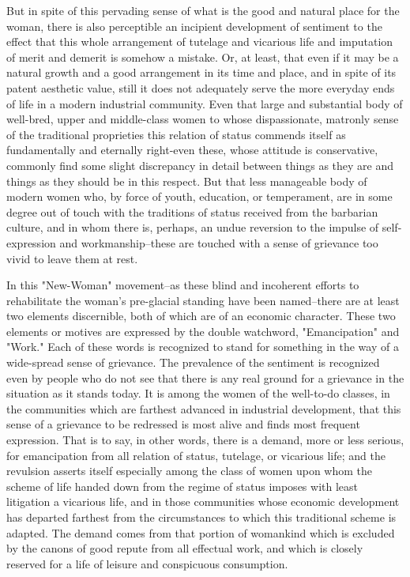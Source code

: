\documentclass[12pt]{report}
\begin{document}
But in spite of this pervading sense of what is the good and natural
place for the woman, there is also perceptible an incipient development
of sentiment to the effect that this whole arrangement of tutelage and
vicarious life and imputation of merit and demerit is somehow a mistake.
Or, at least, that even if it may be a natural growth and a good
arrangement in its time and place, and in spite of its patent aesthetic
value, still it does not adequately serve the more everyday ends of life
in a modern industrial community. Even that large and substantial body
of well-bred, upper and middle-class women to whose dispassionate,
matronly sense of the traditional proprieties this relation of status
commends itself as fundamentally and eternally right-even these, whose
attitude is conservative, commonly find some slight discrepancy in
detail between things as they are and things as they should be in this
respect. But that less manageable body of modern women who, by force of
youth, education, or temperament, are in some degree out of touch with
the traditions of status received from the barbarian culture, and
in whom there is, perhaps, an undue reversion to the impulse of
self-expression and workmanship--these are touched with a sense of
grievance too vivid to leave them at rest.

In this "New-Woman" movement--as these blind and incoherent efforts to
rehabilitate the woman's pre-glacial standing have been named--there
are at least two elements discernible, both of which are of an economic
character. These two elements or motives are expressed by the double
watchword, "Emancipation" and "Work." Each of these words is recognized
to stand for something in the way of a wide-spread sense of grievance.
The prevalence of the sentiment is recognized even by people who do not
see that there is any real ground for a grievance in the situation as
it stands today. It is among the women of the well-to-do classes, in the
communities which are farthest advanced in industrial development, that
this sense of a grievance to be redressed is most alive and finds most
frequent expression. That is to say, in other words, there is a demand,
more or less serious, for emancipation from all relation of status,
tutelage, or vicarious life; and the revulsion asserts itself especially
among the class of women upon whom the scheme of life handed down from
the regime of status imposes with least litigation a vicarious life, and
in those communities whose economic development has departed farthest
from the circumstances to which this traditional scheme is adapted. The
demand comes from that portion of womankind which is excluded by the
canons of good repute from all effectual work, and which is closely
reserved for a life of leisure and conspicuous consumption.
\end{document}
